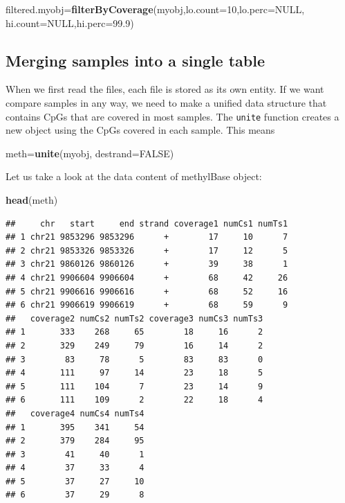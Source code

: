 \documentclass[12pt,]{krantz}
\newenvironment{Shaded}{\begin{snugshade}}{\end{snugshade}}
\newcommand{\DataTypeTok}[1]{\textcolor[rgb]{0.13,0.29,0.53}{#1}}
\newcommand{\DecValTok}[1]{\textcolor[rgb]{0.00,0.00,0.81}{#1}}
\newcommand{\FloatTok}[1]{\textcolor[rgb]{0.00,0.00,0.81}{#1}}
\newcommand{\KeywordTok}[1]{\textcolor[rgb]{0.13,0.29,0.53}{\textbf{#1}}}
\newcommand{\NormalTok}[1]{#1}
\newcommand{\OtherTok}[1]{\textcolor[rgb]{0.56,0.35,0.01}{#1}}
\begin{document}
\begin{Shaded}
\begin{Highlighting}[]
\NormalTok{filtered.myobj=}\KeywordTok{filterByCoverage}\NormalTok{(myobj,}\DataTypeTok{lo.count=}\DecValTok{10}\NormalTok{,}\DataTypeTok{lo.perc=}\OtherTok{NULL}\NormalTok{,}
                                      \DataTypeTok{hi.count=}\OtherTok{NULL}\NormalTok{,}\DataTypeTok{hi.perc=}\FloatTok{99.9}\NormalTok{)}
\end{Highlighting}
\end{Shaded}

\hypertarget{merging-samples-into-a-single-table}{%
\subsection{Merging samples into a single table}\label{merging-samples-into-a-single-table}}

When we first read the files, each file is stored as its own entity. If we want compare samples in any way, we need to make a unified data structure that contains CpGs that are covered in most samples. The \texttt{unite} function creates a new object using the CpGs covered in each sample. This means

\begin{Shaded}
\begin{Highlighting}[]
\NormalTok{meth=}\KeywordTok{unite}\NormalTok{(myobj, }\DataTypeTok{destrand=}\OtherTok{FALSE}\NormalTok{)}
\end{Highlighting}
\end{Shaded}

Let us take a look at the data content of methylBase object:

\begin{Shaded}
\begin{Highlighting}[]
\KeywordTok{head}\NormalTok{(meth)}
\end{Highlighting}
\end{Shaded}

\begin{verbatim}
##     chr   start     end strand coverage1 numCs1 numTs1
## 1 chr21 9853296 9853296      +        17     10      7
## 2 chr21 9853326 9853326      +        17     12      5
## 3 chr21 9860126 9860126      +        39     38      1
## 4 chr21 9906604 9906604      +        68     42     26
## 5 chr21 9906616 9906616      +        68     52     16
## 6 chr21 9906619 9906619      +        68     59      9
##   coverage2 numCs2 numTs2 coverage3 numCs3 numTs3
## 1       333    268     65        18     16      2
## 2       329    249     79        16     14      2
## 3        83     78      5        83     83      0
## 4       111     97     14        23     18      5
## 5       111    104      7        23     14      9
## 6       111    109      2        22     18      4
##   coverage4 numCs4 numTs4
## 1       395    341     54
## 2       379    284     95
## 3        41     40      1
## 4        37     33      4
## 5        37     27     10
## 6        37     29      8
\end{verbatim}
\end{document}
